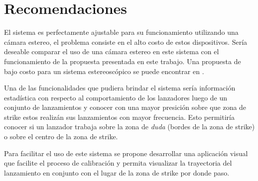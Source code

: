 \chapter*{Recomendaciones}\label{chapter:Recomendations}

El sistema es perfectamente ajustable para su funcionamiento utilizando una cámara estereo, el problema consiste en el alto costo de estos dispositivos. Sería deseable comparar el uso de una cámara estereo en este sistema con el funcionamiento de la propuesta presentada en este trabajo. Una propuesta de bajo costo para un sistema estereoscópico se puede encontrar en \cite{DVD}.

Una de las funcionalidades que pudiera brindar el sistema sería información estadística con respecto al comportamiento de los lanzadores luego de un conjunto de lanzamientos y conocer con una mayor presición sobre que zona de strike estos realizán sus lanzamientos con mayor frecuencia. Esto permitiría conocer si un lanzador trabaja sobre la zona de \textit{duda} (bordes de la zona de strike) o sobre el centro de la zona de strike.

Para facilitar el uso de este sistema se propone desarrollar una aplicación visual que facilite el proceso de calibración y permita visualizar la trayectoria del lanzamiento en conjunto con el lugar de la zona de strike por donde paso.
